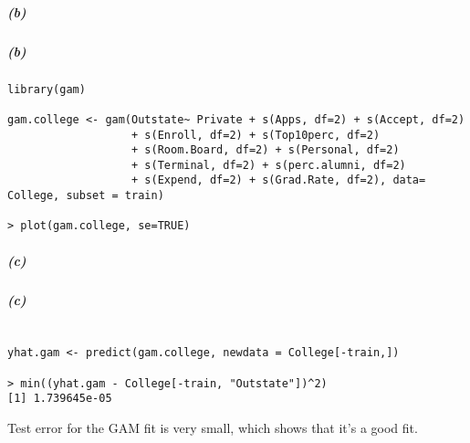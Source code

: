 \documentclass[11pt]{article}
\begin{document}
\subparagraph{(b)}
\subparagraph{(b)}
\begin{lstlisting}
library(gam)

gam.college <- gam(Outstate~ Private + s(Apps, df=2) + s(Accept, df=2) 
                   + s(Enroll, df=2) + s(Top10perc, df=2) 
                   + s(Room.Board, df=2) + s(Personal, df=2) 
                   + s(Terminal, df=2) + s(perc.alumni, df=2) 
                   + s(Expend, df=2) + s(Grad.Rate, df=2), data= College, subset = train)
                   
> plot(gam.college, se=TRUE)
\end{lstlisting}

\begin{figure}[H]
\centering

\label{}
\end{figure}
\begin{figure}[H]
\centering

\label{}
\end{figure}
\begin{figure}[H]
\centering

\label{}
\end{figure}
\begin{figure}[H]
\centering

\label{}
\end{figure}
\begin{figure}[H]
\centering

\label{}
\end{figure}
\begin{figure}[H]
\centering

\label{}
\end{figure}

\subparagraph{(c)}
\subparagraph{(c)}
\begin{lstlisting}

yhat.gam <- predict(gam.college, newdata = College[-train,])

> min((yhat.gam - College[-train, "Outstate"])^2)
[1] 1.739645e-05
\end{lstlisting}
Test error for the GAM fit is very small, which shows that it's a good fit.
\newpage
\end{document}
